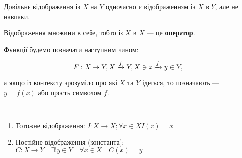 \begin{center}
     
\end{center}

\begin{remark}
    Довільне відображення із $X$ на $Y$ одночасно є відображенням із $X$ в $Y$,
    але не навпаки.
\end{remark}

\begin{definition}
    Відображення множини в себе, тобто із $X$ в $X$ --- це \textbf{оператор}.
\end{definition}

Функції будемо позначати наступним чином:

$$F: X \rightarrow Y, X \xrightarrow{f} Y, X \ni x \xmapsto{f} y \in Y,$$

а якщо із контексту зрозуміло про які $X$ та $Y$ ідеться, то позначають ---
$y = f(x)$ або прость символом $f$.

\begin{example}~

    \begin{enumerate}
        \item Тотожне відображення: $I: X \rightarrow X; \forall x \in X I(x) = x$
        \item Постійне відображення (константа):
            $C: X \rightarrow Y \quad \exists! y \in Y \quad \forall x \in X \quad C(x) = y$
    \end{enumerate}
\end{example}


